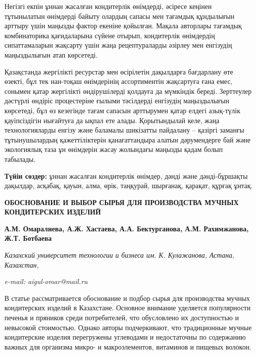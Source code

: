 Негізгі екпін ұннан жасалған кондитерлік өнімдерді, әсіресе кеңінен
тұтынылатын өнімдерді байыту олардың сапасы мен тағамдық құндылығын
арттыру үшін маңызды фактор екеніне қойылған. Мақала авторлары тағамдық
комбинаторика қағидаларына сүйене отырып, кондитерлік өнімдердің
сипаттамаларын жақсарту үшін жаңа рецептураларды әзірлеу мен енгізудің
маңыздылығын атап көрсетеді.

Қазақстанда жергілікті ресурстар мен өсірілетін дақылдарға бағдарлану
өте өзекті, бұл тек нан-тоқаш өнімдерінің ассортиментін жақсартуға ғана
емес, сонымен қатар жергілікті өндірушілерді қолдауға да мүмкіндік
береді. Зерттеулер дәстүрлі өндіріс процестеріне ғылыми тәсілдерді
енгізудің маңыздылығын көрсетеді, бұл өз кезегінде тағам сапасын
арттырумен қатар елдегі азық-түлік қауіпсіздігін нығайтуға да ықпал ете
алады. Қорытындылай келе, жаңа технологияларды енгізу және баламалы
шикізатты пайдалану -- қазіргі заманғы тұтынушылардың қажеттіліктерін
қанағаттандыра алатын дәрумендерге бай және экологиялық таза ұн
өнімдерін жасау жолындағы маңызды қадам болып табылады.

{\bfseries Түйін сөздер:} ұннан жасалған кондитерлік өнімдер, дәнді және
дәнді-бұршақты дақылдар, асқабақ, қауын, алма, өрік, таңқурай, шырғанақ,
қарақат, құрғақ ұнтақ.

\hl{}

\begin{articleheader}
{\bfseries ОБОСНОВАНИЕ И ВЫБОР СЫРЬЯ ДЛЯ ПРОИЗВОДСТВА МУЧНЫХ КОНДИТЕРСКИХ ИЗДЕЛИЙ}

{\bfseries
А.М. Омаралиева\textsuperscript{\envelope },
А.Ж. Хастаева,
А.А. Бектурганова,
А.М. Рахимжанова,
Ж.Т. Ботбаева}
\end{articleheader}

\begin{affiliation}
\emph{Казахский университет технологии и бизнеса им. К. Кулажанова, Астана, Казахстан,}

\emph{e-mail: aigul-omar@mail.ru}
\end{affiliation}

В статье рассматривается обоснование и подбор сырья для производства
мучных кондитерских изделий в Казахстане. Основное внимание уделяется
популярности печенья и пряников среди потребителей, что обусловлено их
доступностью и невысокой стоимостью. Однако авторы подчеркивают, что
традиционные мучные кондитерские изделия перегружены углеводами и
недостаточны по содержанию важных для организма микро- и макроэлементов,
витаминов и пищевых волокон.

